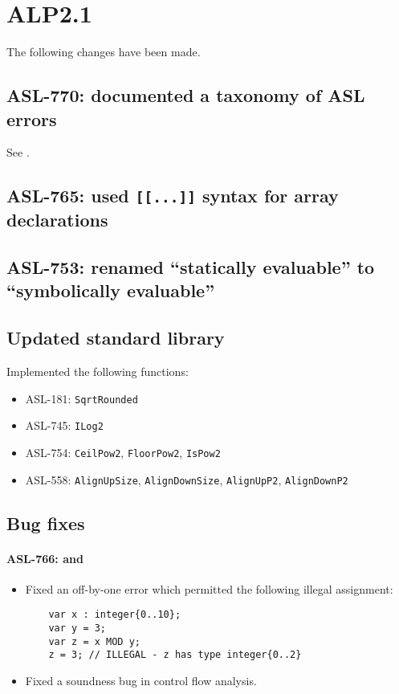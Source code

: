 \section{ALP2.1}

The following changes have been made.

\subsection{ASL-770: documented a taxonomy of ASL errors}
See .

\subsection{ASL-765:	used \texttt{[[...]]} syntax for array declarations}

\subsection{ASL-753: renamed ``statically evaluable'' to ``symbolically evaluable''}

\subsection{Updated standard library}
Implemented the following functions:
\begin{itemize}
  \item ASL-181: \texttt{SqrtRounded}
  \item ASL-745: \texttt{ILog2}
  \item ASL-754: \texttt{CeilPow2}, \texttt{FloorPow2}, \texttt{IsPow2}
  \item ASL-558: \texttt{AlignUpSize}, \texttt{AlignDownSize}, \texttt{AlignUpP2}, \texttt{AlignDownP2}
\end{itemize}

\subsection{Bug fixes}

\paragraph{ASL-766:  and }
\begin{itemize}
  \item Fixed an off-by-one error which permitted the following illegal assignment:
    \begin{verbatim}
    var x : integer{0..10};
    var y = 3;
    var z = x MOD y;
    z = 3; // ILLEGAL - z has type integer{0..2}
    \end{verbatim}
  \item Fixed a soundness bug in control flow analysis.
\end{itemize}

